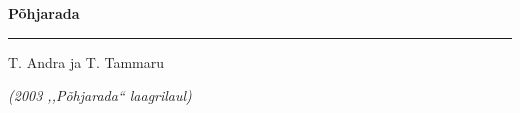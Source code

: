 \documentclass[10pt]{book}
\begin{document}
{
  \samepage
  \raggedbottom
  \raggedright
  \sloppy


  \vspace{0.2in}
    \centerline{
      \bfseries
      \large P\~ohjarada
    }
  \nopagebreak[4]
  \vspace{0.1in}
  \nopagebreak[4]
  \hrule height 0.05ex
  \nopagebreak[4]
  \vspace{-0.05in}

  {\footnotesize  \hfill T. Andra ja T. Tammaru }\\
  \vspace{0.01in}

  {\em {\footnotesize (2003 ,,P\~ohjarada{``} laagrilaul) } }
  \vspace{0.01in}


}
\end{document}

